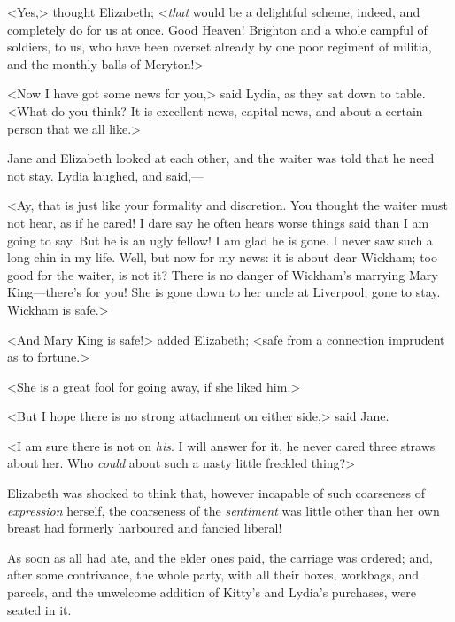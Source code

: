 <Yes,> thought Elizabeth; <\textit{that} would be a delightful scheme, indeed, and completely do for us at once. Good Heaven! Brighton and a whole campful of soldiers, to us, who have been overset already by one poor regiment of militia, and the monthly balls of Meryton!>

<Now I have got some news for you,> said Lydia, as they sat down to table. <What do you think? It is excellent news, capital news, and about a certain person that we all like.>

Jane and Elizabeth looked at each other, and the waiter was told that he need not stay. Lydia laughed, and said,—

<Ay, that is just like your formality and discretion. You thought the waiter must not hear, as if he cared! I dare say he often hears worse things said than I am going to say. But he is an ugly fellow! I am glad he is gone. I never saw such a long chin in my life. Well, but now for my news: it is about dear Wickham; too good for the waiter, is not it? There is no danger of Wickham's marrying Mary King—there's for you! She is gone down to her uncle at Liverpool; gone to stay. Wickham is safe.>

<And Mary King is safe!> added Elizabeth; <safe from a connection imprudent as to fortune.>

<She is a great fool for going away, if she liked him.>

<But I hope there is no strong attachment on either side,> said Jane.

<I am sure there is not on \textit{his}. I will answer for it, he never cared three straws about her. Who \textit{could} about such a nasty little freckled thing?>

Elizabeth was shocked to think that, however incapable of such coarseness of \textit{expression} herself, the coarseness of the \textit{sentiment} was little other than her own breast had formerly harboured and fancied liberal!

As soon as all had ate, and the elder ones paid, the carriage was ordered; and, after some contrivance, the whole party, with all their boxes, workbags, and parcels, and the unwelcome addition of Kitty's and Lydia's purchases, were seated in it.


